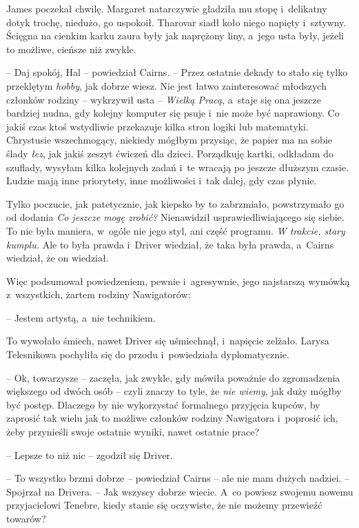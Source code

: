 \documentclass[oneside,polish,12pt,sfheadings]{mwbk}
\begin{document}
James poczekał chwilę. Margaret natarczywie gładziła mu stopę i~delikatny dotyk trochę, niedużo, go uspokoił. Tharovar siadł koło niego
napięty i~sztywny. Ścięgna na cienkim karku zaura były jak naprężony
liny, a~jego usta były, jeżeli to możliwe, cieńsze niż zwykle.

-- Daj spokój, Hal -- powiedział Cairns. -- Przez ostatnie dekady to stało
się tylko przeklętym \emph{hobby}, jak dobrze wiesz. Nie jest łatwo
zainteresować młodszych członków rodziny -- wykrzywił usta -- \emph{Wielką
Pracą}, a~staje się ona jeszcze bardziej nudna, gdy kolejny komputer się
psuje i~nie może być naprawiony. Co jakiś czas ktoś wstydliwie
przekazuje kilka stron logiki lub matematyki. Chrystusie wszechmogący,
niekiedy mógłbym przysiąc, że papier ma na sobie ślady \emph{łez}, jak
jakiś zeszyt ćwiczeń dla dzieci. Porządkuję kartki, odkładam do
szuflady, wysyłam kilka kolejnych zadań i~te wracają po jeszcze dłuższym
czasie. Ludzie mają inne priorytety, inne możliwości i~tak dalej, gdy
czas płynie.

Tylko poczucie, jak patetycznie, jak kiepsko by to zabrzmiało,
powstrzymało go od dodania \emph{Co jeszcze mogę zrobić? } Nienawidził
usprawiedliwiającego się siebie. To nie była maniera, w~ogóle nie jego
styl, ani część programu. \emph{W trakcie, stary kumplu. } Ale to była
prawda i~Driver wiedział, że taka była prawda, a~Cairns wiedział, że on
wiedział.

Więc podsumował powiedzeniem, pewnie i~agresywnie, jego najstarszą
wymówką z~wszystkich, żartem rodziny Nawigatorów:

-- Jestem artystą, a~nie technikiem.

To wywołało śmiech, nawet Driver się uśmiechnął, i~napięcie zelżało.
Larysa Telesnikowa pochyliła się do przodu i~powiedziała dyplomatycznie.

-- Ok, towarzysze -- zaczęła, jak zwykle, gdy mówiła poważnie do
zgromadzenia większego od dwóch osób -- czyli znaczy to tyle, że
\emph{nie wiemy}, jak duży mógłby być postęp. Dlaczego by nie wykorzystać
formalnego przyjęcia kupców, by zaprosić tak wielu jak to możliwe
członków rodziny Nawigatora i~poprosić ich, żeby przynieśli swoje
ostatnie wyniki, nawet ostatnie prace?

-- Lepsze to niż nic -- zgodził się Driver.

-- To wszystko brzmi dobrze -- powiedział Cairns -- ale nie mam dużych
nadziei. -- Spojrzał na Drivera. -- Jak wszyscy dobrze wiecie. A~co
powiesz swojemu nowemu przyjacielowi Tenebre, kiedy stanie się
oczywiste, że nie możemy przewieźć towarów?
\end{document}
